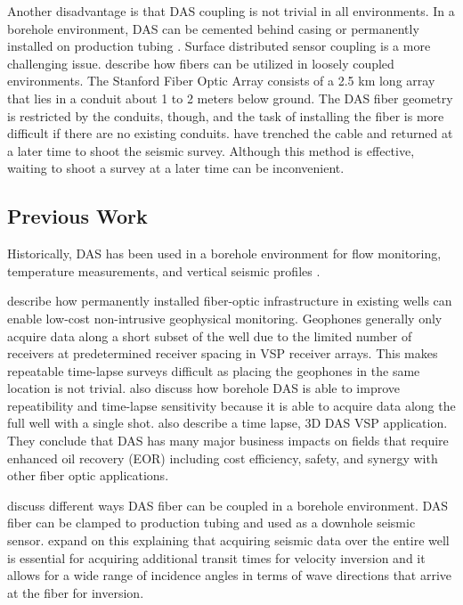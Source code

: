 Another disadvantage is that DAS coupling is not trivial in all environments. In a borehole environment, DAS can be cemented behind casing or permanently installed on production tubing \citep{mateeva2013distributed}. Surface distributed sensor coupling is a more challenging issue. \citet{lindsey2017fiber} describe how fibers can be utilized in loosely coupled environments. The Stanford Fiber Optic Array consists of a 2.5 km long array that lies in a conduit about 1 to 2 meters below ground. The DAS fiber geometry is restricted by the conduits, though, and the task of installing the fiber is more difficult if there are no existing conduits. \citet{daley2013field} have trenched the cable and returned at a later time to shoot the seismic survey. Although this method is effective, waiting to shoot a survey at a later time can be inconvenient.

\subsection{Previous Work}
Historically, DAS has been used in a borehole environment for flow monitoring, temperature measurements, and vertical seismic profiles \citep{clarke1983fiber, krohn2000fiber,mestayer2011field, barberan2012multi, cox2012distributed, daley2013field, mateeva2014distributed}.

\citet{mestayer2011field} describe how permanently installed fiber-optic infrastructure in existing wells can enable low-cost non-intrusive geophysical monitoring. Geophones generally only acquire data along a short subset of the well due to the limited number of receivers at predetermined receiver spacing in VSP receiver arrays. This makes repeatable time-lapse surveys difficult as placing the geophones in the same location is not trivial. \citet{mestayer2011field} also discuss how borehole DAS is able to improve repeatibility and time-lapse sensitivity because it is able to acquire data along the full well with a single shot. \citet{mateeva2014distributed} also describe a time lapse, 3D DAS VSP application. They conclude that DAS has many major business impacts on fields that require enhanced oil recovery (EOR) including cost efficiency, safety, and synergy with other fiber optic applications.

\citet{barberan2012multi} discuss different ways DAS fiber can be coupled in a borehole environment. DAS fiber can be clamped to production tubing and used as a downhole seismic sensor. \citet{barberan2012multi} expand on this explaining that acquiring seismic data over the entire well is essential for acquiring additional transit times for velocity inversion and it allows for a wide range of incidence angles in terms of wave directions that arrive at the fiber for inversion.

